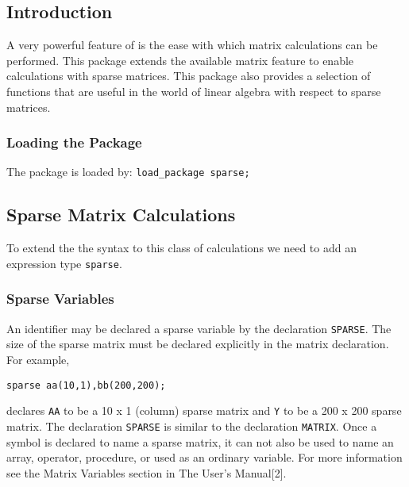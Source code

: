 

\newcommand\sparselineqlist {lin\_eqn$_{1}$,lin\_eqn$_{2}$, \ldots ,lin\_eqn$_{n}$}
\newcommand\sparsematlist   {mat$_{1}$,mat$_{2}$, \ldots ,mat$_{n}$}
\newcommand\sparseveclist   {vec$_{1}$,vec$_{2}$, \ldots ,vec$_{n}$}

\newcommand\sparselazyfootnote{\footnote{The \{\}'s can be omitted.}}


\subsection{Introduction}
A very powerful feature of \REDUCE{} is the ease with which matrix 
calculations can be performed.
This package extends the available matrix feature to enable calculations
with sparse matrices. This package also provides a selection of 
functions that are useful in the world of linear algebra with respect to
sparse matrices.

\subsubsection*{Loading the Package}
The package is loaded by: \texttt{load\_package sparse;}

\subsection{Sparse Matrix Calculations}
To extend the the syntax to this class of calculations we need to add an
expression type \texttt{sparse}.

\subsubsection{Sparse Variables}
An identifier may be declared a sparse variable by the declaration
\texttt{SPARSE}.
The size of the sparse matrix must be declared explicitly in the matrix
declaration. For example,
\begin{verbatim}
sparse aa(10,1),bb(200,200);
\end{verbatim}
declares \texttt{AA} to be a 10 x 1 (column) sparse matrix and \texttt{Y} to 
be a 200 x 200 sparse matrix.
The declaration \texttt{SPARSE} is similar to the declaration \texttt{MATRIX}.
Once a symbol is declared to name a sparse matrix, it can not also be 
used to name an array, operator, procedure, or used as an ordinary 
variable. For more information see the Matrix Variables section in The
\REDUCE {} User's Manual[2].

